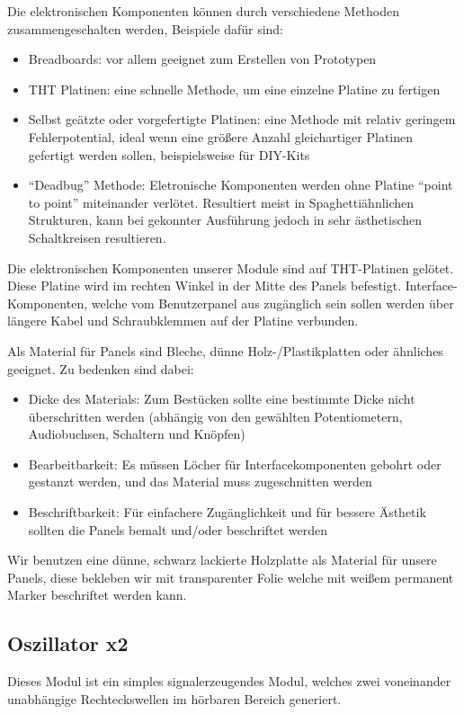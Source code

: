 Die elektronischen Komponenten können durch verschiedene Methoden zusammengeschalten werden, Beispiele dafür sind:
\begin{itemize}
\item Breadboards:
vor allem geeignet zum Erstellen von Prototypen
\item THT Platinen:
eine schnelle Methode, um eine einzelne Platine zu fertigen
\item Selbst geätzte oder vorgefertigte Platinen:
eine Methode mit relativ geringem Fehlerpotential, ideal wenn eine größere Anzahl gleichartiger Platinen gefertigt werden sollen, beispielsweise für DIY-Kits
\item "`Deadbug"' Methode:
Eletronische Komponenten werden ohne Platine "`point to point"' miteinander verlötet. Resultiert meist in Spaghettiähnlichen Strukturen, kann bei gekonnter Ausführung jedoch in sehr ästhetischen Schaltkreisen resultieren.
\end{itemize}

Die elektronischen Komponenten unserer Module sind auf THT-Platinen gelötet. Diese Platine wird im rechten Winkel in der Mitte des Panels befestigt. Interface-Komponenten, welche vom Benutzerpanel aus zugänglich sein sollen werden über längere Kabel und Schraubklemmen auf der Platine verbunden.

Als Material für Panels sind Bleche, dünne Holz-/Plastikplatten oder ähnliches geeignet. Zu bedenken sind dabei:

\begin{itemize}
\item Dicke des Materials:
Zum Bestücken sollte eine bestimmte Dicke nicht überschritten werden (abhängig von den gewählten Potentiometern, Audiobuchsen, Schaltern und Knöpfen)
\item Bearbeitbarkeit:
Es müssen Löcher für Interfacekomponenten gebohrt oder gestanzt werden, und das Material muss zugeschnitten werden
\item Beschriftbarkeit:
Für einfachere Zugänglichkeit und für bessere Ästhetik sollten die Panels bemalt und/oder beschriftet werden
\end{itemize}

Wir benutzen eine dünne, schwarz lackierte Holzplatte als Material für unsere Panels, diese bekleben wir mit transparenter Folie welche mit weißem permanent Marker beschriftet werden kann.

\subsection{Oszillator x2}
\label{sec:org3b54ecd}
Dieses Modul ist ein simples signalerzeugendes Modul, welches zwei voneinander unabhängige Rechteckswellen im hörbaren Bereich generiert.

